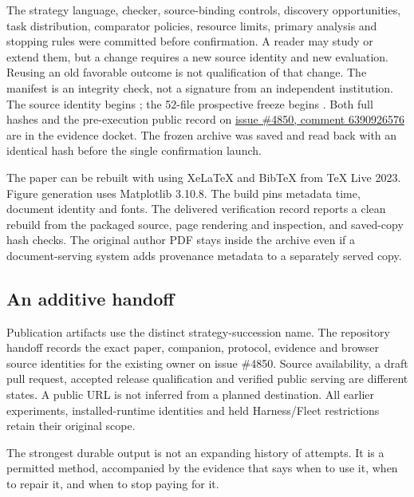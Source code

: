 The strategy language, checker, source-binding controls, discovery opportunities, task distribution, comparator policies, resource limits, primary analysis and stopping rules were committed before confirmation. A reader may study or extend them, but a change requires a new source identity and new evaluation. Reusing an old favorable outcome is not qualification of that change. The manifest is an integrity check, not a signature from an independent institution. The source identity begins ; the 52-file prospective freeze begins . Both full hashes and the pre-execution public record on \href{https://github.com/MontrealAI/AGI-Alpha-Agent-v0/issues/4850#issuecomment-6390926576}{issue \#4850, comment 6390926576} are in the evidence docket. The frozen archive was saved and read back with an identical hash before the single confirmation launch.

The paper can be rebuilt with  using XeLaTeX and BibTeX from TeX Live 2023. Figure generation uses Matplotlib 3.10.8. The build pins metadata time, document identity and fonts. The delivered verification record reports a clean rebuild from the packaged source, page rendering and inspection, and saved-copy hash checks. The original author PDF stays inside the archive even if a document-serving system adds provenance metadata to a separately served copy.

\subsection{An additive handoff}

Publication artifacts use the distinct strategy-succession name. The repository handoff records the exact paper, companion, protocol, evidence and browser source identities for the existing owner on issue \#4850. Source availability, a draft pull request, accepted release qualification and verified public serving are different states. A public URL is not inferred from a planned destination. All earlier experiments, installed-runtime identities and held Harness/Fleet restrictions retain their original scope.

\begin{insight}
The strongest durable output is not an expanding history of attempts. It is a permitted method, accompanied by the evidence that says when to use it, when to repair it, and when to stop paying for it.
\end{insight}

